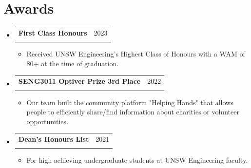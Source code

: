 \documentclass[letterpaper,11pt]{article}
\makeatletter
\newcommand{\resumeItem}[1]{
  \item\small{
    {#1 \vspace{4pt}}
  }
}
\newcommand{\resumeSubheading}[4]{
  \vspace{-10pt}\item
    \begin{tabular*}{0.97\textwidth}[t]{l@{\extracolsep{\fill}}r}
      \textbf{#1} & #2 \\
      \textit{\small#3} & \textit{\small #4} \\
    \end{tabular*}\vspace{0pt}
}
\newcommand{\resumeSubHeadingListStart}{\begin{itemize}[leftmargin=0.15in, label={}]}
\newcommand{\resumeSubHeadingListEnd}{\end{itemize}}
\newcommand{\resumeItemListStart}{\begin{itemize}}
\newcommand{\resumeItemListEnd}{\end{itemize}\vspace{-5pt}}
\makeatother
\begin{document}
\section{Awards}
  \vspace{14pt}
  \resumeSubHeadingListStart

    \resumeSubheading
      {First Class Honours}{2023}
      {}{}
      \vspace{-24pt}
      \resumeItemListStart
                \resumeItem{Received UNSW Engineering's Highest Class of Honours with a WAM of 80+ at the time of graduation.}
            \resumeItemListEnd
      \vspace{4pt}

    \resumeSubheading
      {SENG3011 Optiver Prize 3rd Place}{2022}
      {}{}
      \vspace{-24pt}
      \resumeItemListStart
                \resumeItem{Our team built the community platform "Helping Hands" that allows people to efficiently share/find information about charities or volunteer opportunities.}
            \resumeItemListEnd
      \vspace{4pt}

    \resumeSubheading
      {Dean's Honours List}{2021}
      {}{}
      \vspace{-24pt}
      \resumeItemListStart
                \resumeItem{For high achieving undergraduate students at UNSW Engineering faculty.}
            \resumeItemListEnd
      

  \resumeSubHeadingListEnd


\end{document}
